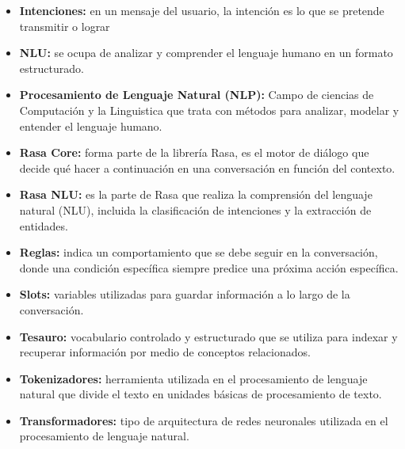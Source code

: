 \begin{itemize}
	\item \textbf{Intenciones:} en un mensaje del usuario, la intención es lo que se pretende transmitir o lograr
	\item \textbf{NLU:} se ocupa de analizar y comprender el lenguaje humano en un formato estructurado.
	\item \textbf{Procesamiento de Lenguaje Natural (NLP):} Campo de ciencias de Computación y la Linguistica que trata con métodos para analizar, modelar y entender el lenguaje humano.
	\item \textbf{Rasa Core:} forma parte de la librería Rasa, es el motor de diálogo que decide qué hacer a continuación en una conversación en función del contexto.
	\item \textbf{Rasa NLU:} es la parte de Rasa que realiza la comprensión del lenguaje natural (NLU), incluida la clasificación de intenciones y la extracción de entidades.
	\item \textbf{Reglas:} indica un comportamiento que se debe seguir en la conversación, donde una condición específica siempre predice una próxima acción específica.
	\item \textbf{Slots:} variables utilizadas para guardar información a lo largo de la conversación.
	\item \textbf{Tesauro:} vocabulario controlado y estructurado que se utiliza para indexar y recuperar información por medio de conceptos relacionados.
	\item \textbf{Tokenizadores:} herramienta utilizada en el procesamiento de lenguaje natural que divide el texto en unidades básicas de procesamiento de texto.
	\item \textbf{Transformadores:} tipo de arquitectura de redes neuronales utilizada en el procesamiento de lenguaje natural.
\end{itemize}
